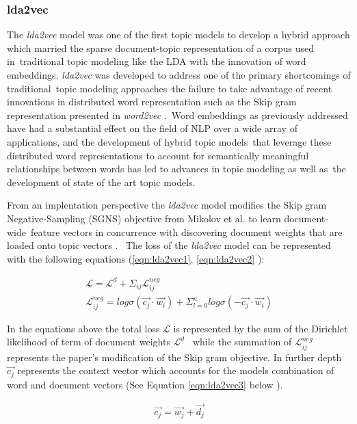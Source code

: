 \documentclass[letterpaper,12pt]{article}
\begin{document}
\subsubsection{lda2vec}
The \emph{lda2vec} model was one of the first topic models to develop a hybrid approach which married the sparse document-topic representation of a corpus used in\
traditional topic modeling like the LDA with the innovation of word embeddings. \emph{lda2vec} was developed to address one of the primary shortcomings of traditional\
topic modeling approaches--the failure to take advantage of recent innovations in distributed word representation such as the Skip gram representation presented in \emph{word2vec} \cite{mikolov2013distributed}.\
Word embeddings as previously addressed have had a substantial effect on the field of NLP over a wide array of applications, and the development of hybrid topic models\
that leverage these distributed word representations to account for semantically meaningful relationships between words has led to advances in topic modeling as well as\
the development of state of the art topic models.

From an implentation perspective the \emph{lda2vec} model modifies the Skip gram Negative-Sampling (SGNS) objective from Mikolov et al. \cite{mikolov2013distributed} to learn document-wide\
feature vectors in concurrence with discovering document weights that are loaded onto topic vectors \cite{moody2016mixing}. \
The loss of the \emph{lda2vec} model can be represented with the following equations (\ref{eqn:lda2vec1}, \ref{eqn:lda2vec2} \cite{moody2016mixing}):

\begin{eqnarray}
	\label{eqn:lda2vec1}
		\mathcal{L} = \mathcal{L}^d +\Sigma_{ij} \mathcal{L}^{neg}_{ij}  \\
	\label{eqn:lda2vec2}
	\mathcal{L}^{neg}_{ij} = log \sigma (\vec{c_j} \cdot \vec{w_i}) + \Sigma^n_{l=0} log \sigma (-\vec{c_j} \cdot \vec{w_i})
\end{eqnarray}

In the equations above the total loss $\mathcal{L}$ is represented by the sum of the Dirichlet likelihood of term of document weights $\mathcal{L}^d$ \
while the summation of $\mathcal{L}^{neg}_{ij}$ represents the paper's modification of the Skip gram objective. In further depth \
$\vec{c_j}$ represents the context vector which accounts for the models combination of word and document vectors (See Equation \ref{eqn:lda2vec3} below \cite{moody2016mixing}).

\begin{eqnarray}
	\label{eqn:lda2vec3}
	\vec{c_j} = \vec{w_j} + \vec{d_j}
\end{eqnarray}
\end{document}
